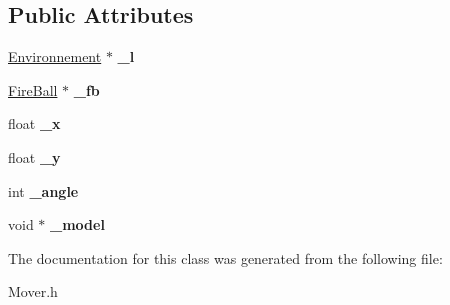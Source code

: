 \subsection*{Public Attributes}
\begin{DoxyCompactItemize}
\item 
\mbox{\label{classMover_abb7d4bee1bba787f98e9c0b23624d914}} 
\hyperlink{classEnvironnement}{Environnement} $\ast$ {\bfseries \+\_\+l}
\item 
\mbox{\label{classMover_a22a3132ed0579d2a155b1573a27604f3}} 
\hyperlink{classFireBall}{Fire\+Ball} $\ast$ {\bfseries \+\_\+fb}
\item 
\mbox{\label{classMover_aaf143c6da9fb16aa10d041b73107d68b}} 
float {\bfseries \+\_\+x}
\item 
\mbox{\label{classMover_ab0accef354ef4f78b61404fbc81c1ade}} 
float {\bfseries \+\_\+y}
\item 
\mbox{\label{classMover_a76d84bfa5079c3a8ddf6d7f17e3898e2}} 
int {\bfseries \+\_\+angle}
\item 
\mbox{\label{classMover_a92885841309ed1f2703fcfe7c56fcf42}} 
void $\ast$ {\bfseries \+\_\+model}
\end{DoxyCompactItemize}


The documentation for this class was generated from the following file\+:\begin{DoxyCompactItemize}
\item 
Mover.\+h\end{DoxyCompactItemize}
